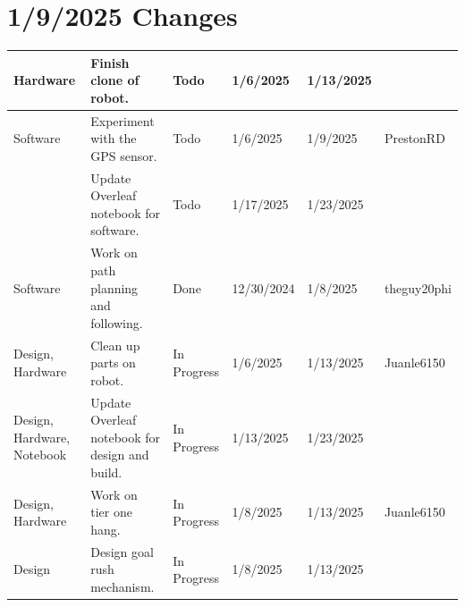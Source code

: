 \section{1/9/2025 Changes}
\begin{center}
\begin{longtable}{| p{40pt} | p{150pt} | p{35pt} | p{33pt} | p{33pt} | p{40pt} |}
\hline \rowcolor{IndianRed1}
Hardware & Finish clone of robot. & Todo & 1/6/2025 & 1/13/2025 & \\
\hline \rowcolor{IndianRed1}
Software & Experiment with the GPS sensor. & Todo & 1/6/2025 & 1/9/2025 & PrestonRD \\
\hline \rowcolor{IndianRed1}
& Update Overleaf notebook for software. & Todo & 1/17/2025 & 1/23/2025 & \\
\hline \rowcolor{DarkSeaGreen1}
Software & Work on path planning and following. & Done & 12/30/2024 & 1/8/2025 & theguy20phi \\
\hline \rowcolor{LightGoldenrod1}
Design, Hardware & Clean up parts on robot. & In Progress & 1/6/2025 & 1/13/2025 & Juanle6150 \\
\hline \rowcolor{LightGoldenrod1}
Design, Hardware, Notebook & Update Overleaf notebook for design and build. & In Progress & 1/13/2025 & 1/23/2025 & \\
\hline \rowcolor{LightGoldenrod1}
Design, Hardware & Work on tier one hang. & In Progress & 1/8/2025 & 1/13/2025 & Juanle6150 \\
\hline \rowcolor{LightGoldenrod1}
Design & Design goal rush mechanism. & In Progress & 1/8/2025 & 1/13/2025 & \\
\hline
\end{longtable}
\end{center}


